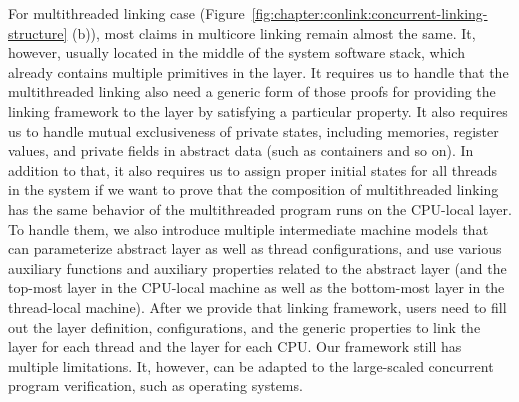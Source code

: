 For multithreaded linking case (Figure~\ref{fig:chapter:conlink:concurrent-linking-structure} (b)), most claims in multicore linking remain almost the same. 
It, however, usually located in the middle of the system software stack, which already contains multiple primitives in the layer. 
It requires us to handle that the multithreaded linking also need a generic form of those proofs for providing the linking framework to the layer by satisfying a particular property. 
It also requires us to handle mutual exclusiveness of 
private states, including memories, register values, and private fields in abstract data (such as containers and so on).
In addition to that, it also requires us to assign proper initial states for all threads in the system if we want to prove that the composition of multithreaded linking has the same behavior of the multithreaded program runs on the CPU-local layer. 
To handle them, we also introduce multiple intermediate machine models that can parameterize abstract layer as well as thread configurations, and use various auxiliary functions and auxiliary properties related to the abstract layer (and the top-most layer in the CPU-local machine as well as the bottom-most layer in the thread-local machine). 
After we provide that linking framework, users need to 
fill out the layer definition, configurations, and the generic properties to link the layer for each thread and the layer for each CPU.
Our framework still has multiple limitations. 
It, however, can be adapted to the large-scaled concurrent program verification, such as operating systems. 








%
%



